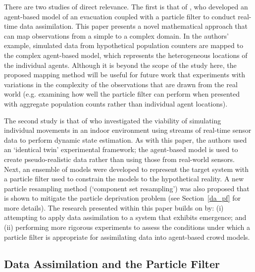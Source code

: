 There are two studies of direct relevance. The first is that of \citep{lueck_who_2019}, who developed an agent-based model of an evacuation coupled with a particle filter to conduct real-time data assimilation. This paper presents a novel mathematical approach that can map observations from a simple to a complex domain. In the authors' example, simulated data from hypothetical population counters are mapped to the complex agent-based model, which represents the heterogeneous locations of the individual agents. Although it is beyond the scope of the study here, the proposed mapping method will be useful for future work that experiments with variations in the complexity of the observations that are drawn from the real world (e.g. examining how well the particle filter can perform when presented with aggregate population counts rather than individual agent locations).

The second study is that of \citep{wang_data_2015} who investigated the viability of simulating individual movements in an indoor environment using streams of real-time sensor data to perform dynamic state estimation. As with this paper, the authors used an `identical twin' experimental framework; the agent-based model is used to create pseudo-realistic data rather than using those from real-world sensors. Next, an ensemble of models were developed to represent the target system with a particle filter used to constrain the models to the hypothetical reality. A new particle resampling method (`component set resampling') was also proposed that is shown to mitigate the particle deprivation problem (see Section~\ref{da_pf} for more details). The research presented within this paper builds on \citep{wang_data_2015} by: (i) attempting to apply data assimilation to a system that exhibits emergence; and (ii) performing more rigorous experiments to assess the conditions under which a particle filter is appropriate for assimilating data into agent-based crowd models.

\subsection{Data Assimilation and the Particle Filter\label{da_pf}}

